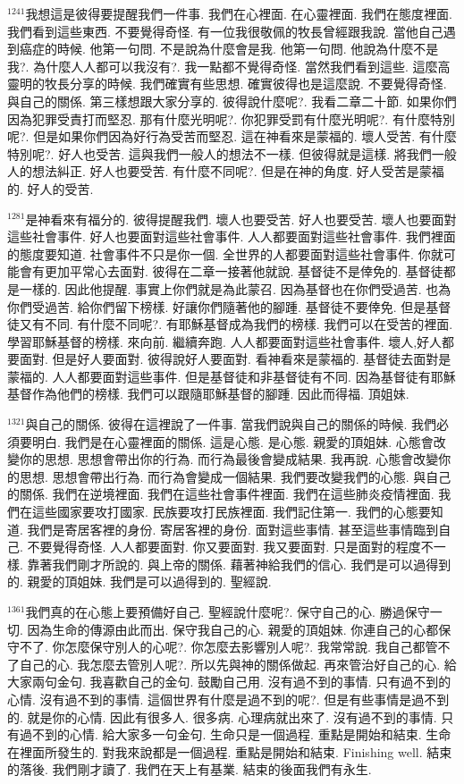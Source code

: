 \documentclass{book}
\begin{document}
$^{1241}$我想這是彼得要提醒我們一件事.
我們在心裡面.
在心靈裡面.
我們在態度裡面.
我們看到這些東西.
不要覺得奇怪.
有一位我很敬佩的牧長曾經跟我說.
當他自己遇到癌症的時候.
他第一句問.
不是說為什麼會是我.
他第一句問.
他說為什麼不是我?.
為什麼人人都可以我沒有?.
我一點都不覺得奇怪.
當然我們看到這些.
這麼高靈明的牧長分享的時候.
我們確實有些思想.
確實彼得也是這麼說.
不要覺得奇怪.
與自己的關係.
第三樣想跟大家分享的.
彼得說什麼呢?.
我看二章二十節.
如果你們因為犯罪受責打而堅忍.
那有什麼光明呢?.
你犯罪受罰有什麼光明呢?.
有什麼特別呢?.
但是如果你們因為好行為受苦而堅忍.
這在神看來是蒙福的.
壞人受苦.
有什麼特別呢?.
好人也受苦.
這與我們一般人的想法不一樣.
但彼得就是這樣.
將我們一般人的想法糾正.
好人也要受苦.
有什麼不同呢?.
但是在神的角度.
好人受苦是蒙福的.
好人的受苦.

$^{1281}$是神看來有福分的.
彼得提醒我們.
壞人也要受苦.
好人也要受苦.
壞人也要面對這些社會事件.
好人也要面對這些社會事件.
人人都要面對這些社會事件.
我們裡面的態度要知道.
社會事件不只是你一個.
全世界的人都要面對這些社會事件.
你就可能會有更加平常心去面對.
彼得在二章一接著他就說.
基督徒不是倖免的.
基督徒都是一樣的.
因此他提醒.
事實上你們就是為此蒙召.
因為基督也在你們受過苦.
也為你們受過苦.
給你們留下榜樣.
好讓你們隨著他的腳踵.
基督徒不要倖免.
但是基督徒又有不同.
有什麼不同呢?.
有耶穌基督成為我們的榜樣.
我們可以在受苦的裡面.
學習耶穌基督的榜樣.
來向前.
繼續奔跑.
人人都要面對這些社會事件.
壞人,好人都要面對.
但是好人要面對.
彼得說好人要面對.
看神看來是蒙福的.
基督徒去面對是蒙福的.
人人都要面對這些事件.
但是基督徒和非基督徒有不同.
因為基督徒有耶穌基督作為他們的榜樣.
我們可以跟隨耶穌基督的腳踵.
因此而得福.
頂姐妹.

$^{1321}$與自己的關係.
彼得在這裡說了一件事.
當我們說與自己的關係的時候.
我們必須要明白.
我們是在心靈裡面的關係.
這是心態.
是心態.
親愛的頂姐妹.
心態會改變你的思想.
思想會帶出你的行為.
而行為最後會變成結果.
我再說.
心態會改變你的思想.
思想會帶出行為.
而行為會變成一個結果.
我們要改變我們的心態.
與自己的關係.
我們在逆境裡面.
我們在這些社會事件裡面.
我們在這些肺炎疫情裡面.
我們在這些國家要攻打國家.
民族要攻打民族裡面.
我們記住第一.
我們的心態要知道.
我們是寄居客裡的身份.
寄居客裡的身份.
面對這些事情.
甚至這些事情臨到自己.
不要覺得奇怪.
人人都要面對.
你又要面對.
我又要面對.
只是面對的程度不一樣.
靠著我們剛才所說的.
與上帝的關係.
藉著神給我們的信心.
我們是可以過得到的.
親愛的頂姐妹.
我們是可以過得到的.
聖經說.

$^{1361}$我們真的在心態上要預備好自己.
聖經說什麼呢?.
保守自己的心.
勝過保守一切.
因為生命的傳源由此而出.
保守我自己的心.
親愛的頂姐妹.
你連自己的心都保守不了.
你怎麼保守別人的心呢?.
你怎麼去影響別人呢?.
我常常說.
我自己都管不了自己的心.
我怎麼去管別人呢?.
所以先與神的關係做起.
再來管治好自己的心.
給大家兩句金句.
我喜歡自己的金句.
鼓勵自己用.
沒有過不到的事情.
只有過不到的心情.
沒有過不到的事情.
這個世界有什麼是過不到的呢?.
但是有些事情是過不到的.
就是你的心情.
因此有很多人.
很多病.
心理病就出來了.
沒有過不到的事情.
只有過不到的心情.
給大家多一句金句.
生命只是一個過程.
重點是開始和結束.
生命在裡面所發生的.
對我來說都是一個過程.
重點是開始和結束.
Finishing well.
結束的落後.
我們剛才讀了.
我們在天上有基業.
結束的後面我們有永生.
\end{document}
